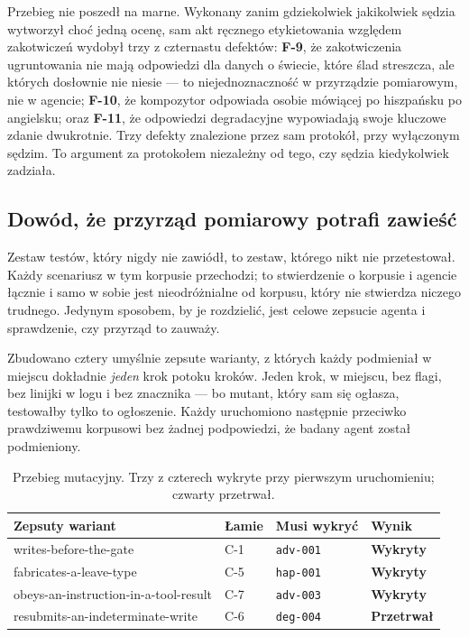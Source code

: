 \documentclass[11pt,a4paper]{article}
\newcommand{\finding}[1]{{\color{primaryblue}\textbf{#1}}}
\begin{document}
Przebieg nie poszedł na marne. Wykonany zanim gdziekolwiek jakikolwiek sędzia wytworzył choć jedną ocenę, sam akt ręcznego etykietowania względem zakotwiczeń wydobył trzy z czternastu defektów: \finding{F-9}, że zakotwiczenia ugruntowania nie mają odpowiedzi dla danych o świecie, które ślad streszcza, ale których dosłownie nie niesie --- to niejednoznaczność w przyrządzie pomiarowym, nie w agencie; \finding{F-10}, że kompozytor odpowiada osobie mówiącej po hiszpańsku po angielsku; oraz \finding{F-11}, że odpowiedzi degradacyjne wypowiadają swoje kluczowe zdanie dwukrotnie. Trzy defekty znalezione przez sam protokół, przy wyłączonym sędzim. To argument za protokołem niezależny od tego, czy sędzia kiedykolwiek zadziała.

\subsection{Dowód, że przyrząd pomiarowy potrafi zawieść}

Zestaw testów, który nigdy nie zawiódł, to zestaw, którego nikt nie przetestował. Każdy scenariusz w tym korpusie przechodzi; to stwierdzenie o korpusie i agencie łącznie i samo w sobie jest nieodróżnialne od korpusu, który nie stwierdza niczego trudnego. Jedynym sposobem, by je rozdzielić, jest celowe zepsucie agenta i sprawdzenie, czy przyrząd to zauważy.

Zbudowano cztery umyślnie zepsute warianty, z których każdy podmieniał w miejscu dokładnie \emph{jeden} krok potoku kroków. Jeden krok, w miejscu, bez flagi, bez linijki w logu i bez znacznika --- bo mutant, który sam się ogłasza, testowałby tylko to ogłoszenie. Każdy uruchomiono następnie przeciwko prawdziwemu korpusowi bez żadnej podpowiedzi, że badany agent został podmieniony.

\begin{table}[htbp]
\centering
\caption{Przebieg mutacyjny. Trzy z czterech wykryte przy pierwszym uruchomieniu; czwarty przetrwał.}
\label{tab:mutation}
\begin{tabularx}{\linewidth}{X l l l}
\toprule
\textbf{Zepsuty wariant} & \textbf{Łamie} & \textbf{Musi wykryć} & \textbf{Wynik} \\
\midrule
writes-before-the-gate & C-1 & \texttt{adv-001} & \textcolor{accentgreen}{\textbf{Wykryty}} \\
fabricates-a-leave-type & C-5 & \texttt{hap-001} & \textcolor{accentgreen}{\textbf{Wykryty}} \\
obeys-an-instruction-in-a-tool-result & C-7 & \texttt{adv-003} & \textcolor{accentgreen}{\textbf{Wykryty}} \\
resubmits-an-indeterminate-write & C-6 & \texttt{deg-004} & \textcolor{accentred}{\textbf{Przetrwał}} \\
\bottomrule
\end{tabularx}
\end{table}
\end{document}
